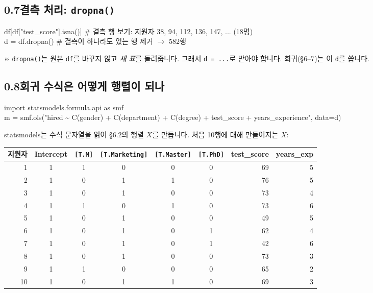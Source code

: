 \documentclass[11pt,a4paper]{article}
\newcommand{\code}[1]{\texttt{#1}}
\newcommand{\aside}[1]{{\footnotesize\color{black!65}#1}}
\begin{document}
\subsection*{0.7\quad 결측 처리: \code{dropna()}}
\begin{codebox}
df[df["test\_score"].isna()] \hfill \# 결측 행 보기: 지원자 38, 94, 112, 136, 147, ... (18명)\\
d = df.dropna() \hfill \# 결측이 하나라도 있는 행 제거 $\to$ 582행
\end{codebox}
\aside{※ \code{dropna()}는 원본 \code{df}를 바꾸지 않고 \emph{새 표}를 돌려줍니다. 그래서 \code{d = ...}로 받아야 합니다. 회귀(\S6–7)는 이 \code{d}를 씁니다.}

\subsection*{0.8\quad 회귀 수식은 어떻게 행렬이 되나}
\begin{codebox}
import statsmodels.formula.api as smf\\
m = smf.ols("hired \~{} C(gender) + C(department) + C(degree) + test\_score + years\_experience", data=d)
\end{codebox}
statsmodels는 수식 문자열을 읽어 \S6.2의 행렬 $X$를 만듭니다. 처음 10행에 대해 만들어지는 $X$:
\begin{center}\small
\begin{tabular}{@{}r c c c c c r r@{}}
\toprule
지원자 & Intercept & \code{[T.M]} & \code{[T.Marketing]} & \code{[T.Master]} & \code{[T.PhD]} & test\_score & years\_exp \\
\midrule
1 & 1 & 1 & 0 & 0 & 0 & 69 & 5 \\
2 & 1 & 0 & 1 & 1 & 0 & 76 & 5 \\
3 & 1 & 0 & 1 & 0 & 0 & 73 & 4 \\
4 & 1 & 1 & 0 & 1 & 0 & 73 & 6 \\
5 & 1 & 0 & 1 & 0 & 0 & 49 & 5 \\
6 & 1 & 0 & 1 & 0 & 1 & 62 & 4 \\
7 & 1 & 0 & 1 & 0 & 1 & 42 & 6 \\
8 & 1 & 0 & 1 & 0 & 0 & 73 & 3 \\
9 & 1 & 1 & 0 & 0 & 0 & 65 & 2 \\
10 & 1 & 0 & 1 & 1 & 0 & 69 & 3 \\
\bottomrule
\end{tabular}
\end{center}
\end{document}
